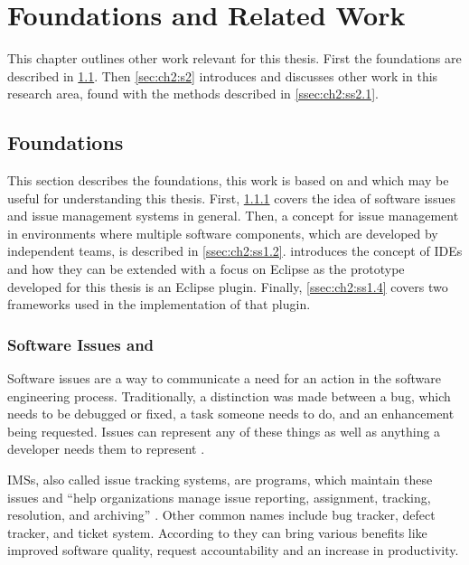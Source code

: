 
\chapter{Foundations and Related Work}
\label{chap:ch2}
This chapter outlines other work relevant for this thesis.
First the foundations are described in \cref{sec:ch2:s1}.
Then \cref{sec:ch2:s2} introduces and discusses other work in this research area, 
found with the methods described in \cref{ssec:ch2:ss2.1}.

\section{Foundations}
\label{sec:ch2:s1}
This section describes the foundations, this work is based on and which may be useful for understanding this thesis.
First, \cref{ssec:ch2:ss1.1} covers the idea of software issues and issue management systems in general.
Then, a concept for issue management in environments where multiple software components, 
which are developed by independent teams, is described in \cref{ssec:ch2:ss1.2}.
 introduces the concept of \glspl{IDE} and how they can be extended 
with a focus on \gls{Eclipse} as the prototype developed for this thesis is an \gls{Eclipse} plugin.
Finally, \cref{ssec:ch2:ss1.4} covers two frameworks used in the implementation of that plugin.

\subsection{Software Issues and }
\label{ssec:ch2:ss1.1}
Software issues are a way to communicate a need for an action in the software engineering process.
Traditionally, a distinction was made between a bug, which needs to be debugged or fixed, a task someone needs to do, 
and an enhancement being requested.
Issues can represent any of these things as well as anything a developer needs them to represent \cite{Atlassian2020Issue,Github2020Issues}.

\glspl{IMS}, also called issue tracking systems, are programs, which maintain these issues 
and ``help organizations manage issue reporting, assignment, tracking, resolution, and archiving'' \cite{bertram2010communication}.
Other common names include bug tracker, defect tracker, and ticket system.
According to \cite{janak2009issue} they can bring various benefits like improved software quality, request accountability and 
an increase in productivity. 

